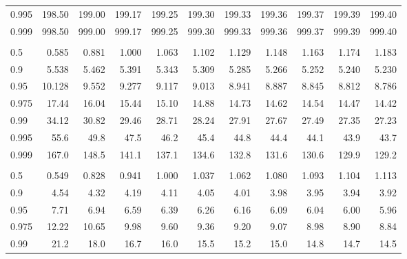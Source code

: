 \documentclass[]{article}
\begin{document}
\begin{table}[H]
\begin{tabular}{lrrrrrrrrrr}
\hspace{1em}0.995 & 198.50 & 199.00 & 199.17 & 199.25 & 199.30 & 199.33 & 199.36 & 199.37 & 199.39 & 199.40\\
\hspace{1em}0.999 & 998.50 & 999.00 & 999.17 & 999.25 & 999.30 & 999.33 & 999.36 & 999.37 & 999.39 & 999.40\\
\addlinespace[0.3em]
\multicolumn{11}{l}{\textbf{$k_2=3$}}\\
\hspace{1em}0.5 & 0.585 & 0.881 & 1.000 & 1.063 & 1.102 & 1.129 & 1.148 & 1.163 & 1.174 & 1.183\\
\hspace{1em}0.9 & 5.538 & 5.462 & 5.391 & 5.343 & 5.309 & 5.285 & 5.266 & 5.252 & 5.240 & 5.230\\
\hspace{1em}0.95 & 10.128 & 9.552 & 9.277 & 9.117 & 9.013 & 8.941 & 8.887 & 8.845 & 8.812 & 8.786\\
\hspace{1em}0.975 & 17.44 & 16.04 & 15.44 & 15.10 & 14.88 & 14.73 & 14.62 & 14.54 & 14.47 & 14.42\\
\hspace{1em}0.99 & 34.12 & 30.82 & 29.46 & 28.71 & 28.24 & 27.91 & 27.67 & 27.49 & 27.35 & 27.23\\
\hspace{1em}0.995 & 55.6 & 49.8 & 47.5 & 46.2 & 45.4 & 44.8 & 44.4 & 44.1 & 43.9 & 43.7\\
\hspace{1em}0.999 & 167.0 & 148.5 & 141.1 & 137.1 & 134.6 & 132.8 & 131.6 & 130.6 & 129.9 & 129.2\\
\addlinespace[0.3em]
\multicolumn{11}{l}{\textbf{$k_2=4$}}\\
\hspace{1em}0.5 & 0.549 & 0.828 & 0.941 & 1.000 & 1.037 & 1.062 & 1.080 & 1.093 & 1.104 & 1.113\\
\hspace{1em}0.9 & 4.54 & 4.32 & 4.19 & 4.11 & 4.05 & 4.01 & 3.98 & 3.95 & 3.94 & 3.92\\
\hspace{1em}0.95 & 7.71 & 6.94 & 6.59 & 6.39 & 6.26 & 6.16 & 6.09 & 6.04 & 6.00 & 5.96\\
\hspace{1em}0.975 & 12.22 & 10.65 & 9.98 & 9.60 & 9.36 & 9.20 & 9.07 & 8.98 & 8.90 & 8.84\\
\hspace{1em}0.99 & 21.2 & 18.0 & 16.7 & 16.0 & 15.5 & 15.2 & 15.0 & 14.8 & 14.7 & 14.5\\

\end{tabular}
\end{table}
\end{document}
